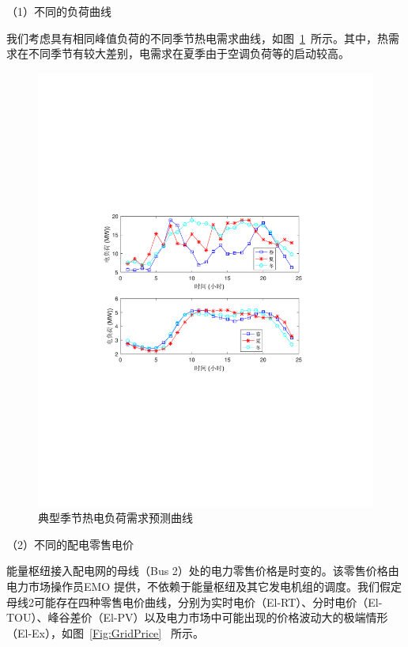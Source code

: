 （1）不同的负荷曲线

我们考虑具有相同峰值负荷的不同季节热电需求曲线，如图~\ref{Fig:loadshape}~所示。其中，热需求在不同季节有较大差别，电需求在夏季由于空调负荷等的启动较高。

\begin{figure}[!t]
\centering
\includegraphics[scale=0.85]{figures/Chap4-6-LoadCurve.pdf}
\caption{典型季节热电负荷需求预测曲线}
\label{Fig:loadshape}
\end{figure}

（2）不同的配电零售电价

能量枢纽接入配电网的母线（Bus 2）处的电力零售价格是时变的。该零售价格由电力市场操作员EMO 提供，不依赖于能量枢纽及其它发电机组的调度。我们假定母线2可能存在四种零售电价曲线，分别为实时电价（El-RT）、分时电价（El-TOU）、峰谷差价（El-PV）以及电力市场中可能出现的价格波动大的极端情形（El-Ex），如图~\ref{Fig:GridPrice}~ 所示。


